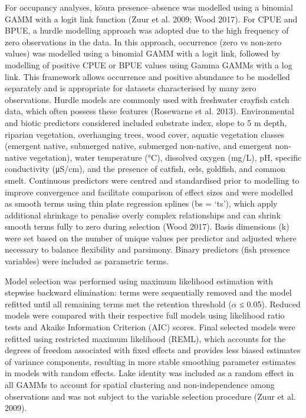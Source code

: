 \documentclass[
  12pt,
  a4paper,
  oneside]{scrbook}
\begin{document}
For occupancy analyses, kōura presence--absence was modelled using a
binomial GAMM with a logit link function (Zuur et al. 2009; Wood 2017).
For CPUE and BPUE, a hurdle modelling approach was adopted due to the
high frequency of zero observations in the data. In this approach,
occurrence (zero vs non-zero values) was modelled using a binomial GAMM
with a logit link, followed by modelling of positive CPUE or BPUE values
using Gamma GAMMs with a log link. This framework allows occurrence and
positive abundance to be modelled separately and is appropriate for
datasets characterised by many zero observations. Hurdle models are
commonly used with freshwater crayfish catch data, which often possess
these features (Rosewarne et al. 2013). Environmental and biotic
predictors considered included substrate index, slope to 5 m depth,
riparian vegetation, overhanging trees, wood cover, aquatic vegetation
classes (emergent native, submerged native, submerged non-native, and
emergent non-native vegetation), water temperature (°C), dissolved
oxygen (mg/L), pH, specific conductivity (μS/cm), and the presence of
catfish, eels, goldfish, and common smelt. Continuous predictors were
centred and standardised prior to modelling to improve convergence and
facilitate comparison of effect sizes and were modelled as smooth terms
using thin plate regression splines (bs = `ts'), which apply additional
shrinkage to penalise overly complex relationships and can shrink smooth
terms fully to zero during selection (Wood 2017). Basis dimensions (k)
were set based on the number of unique values per predictor and adjusted
where necessary to balance flexibility and parsimony. Binary predictors
(fish presence variables) were included as parametric terms.

Model selection was performed using maximum likelihood estimation with
stepwise backward elimination: terms were sequentially removed and the
model refitted until all remaining terms met the retention threshold
(\(\alpha\) ≤ 0.05). Reduced models were compared with their respective
full models using likelihood ratio tests and Akaike Information
Criterion (AIC) scores. Final selected models were refitted using
restricted maximum likelihood (REML), which accounts for the degrees of
freedom associated with fixed effects and provides less biased estimates
of variance components, resulting in more stable smoothing parameter
estimates in models with random effects. Lake identity was included as a
random effect in all GAMMs to account for spatial clustering and
non-independence among observations and was not subject to the variable
selection procedure (Zuur et al. 2009).
\end{document}
